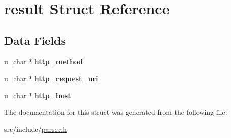 \hypertarget{structresult}{}\section{result Struct Reference}
\label{structresult}
\subsection*{Data Fields}
\begin{DoxyCompactItemize}
\item 
\hypertarget{structresult_a306f5f3feb42b86aacdf862aa2b0a2d4}{}u\+\_\+char $\ast$ {\bfseries http\+\_\+method}\label{structresult_a306f5f3feb42b86aacdf862aa2b0a2d4}

\item 
\hypertarget{structresult_af49d50140ae23451f732ca42d85af139}{}u\+\_\+char $\ast$ {\bfseries http\+\_\+request\+\_\+uri}\label{structresult_af49d50140ae23451f732ca42d85af139}

\item 
\hypertarget{structresult_a8d4eb0b990e13e4440a121539cc0738b}{}u\+\_\+char $\ast$ {\bfseries http\+\_\+host}\label{structresult_a8d4eb0b990e13e4440a121539cc0738b}

\end{DoxyCompactItemize}


The documentation for this struct was generated from the following file\+:\begin{DoxyCompactItemize}
\item 
src/include/\hyperlink{parser_8h}{parser.\+h}\end{DoxyCompactItemize}
